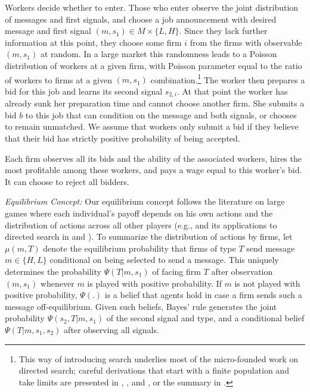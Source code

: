\documentclass[12pt]{article}
\begin{document}
Workers decide whether to enter. Those who enter observe the joint distribution of
messages and first signals, and choose a job announcement with desired
message and first signal $(m,s_{1})\in M\times \{L,H\}$. Since they lack
further information at this point, they choose some firm $i$ from the firms
with observable $(m,s_{1})$ at random. In a large market this randomness
leads to a Poisson distribution of workers at a given firm, with Poisson
parameter equal to the ratio of workers to firms at a given $(m,s_{1})$
combination.\footnote{%
This way of introducing search underlies most of the micro-founded work on
directed search; careful derivations that start with a finite population
and take limits are presented in \cite{peters_1991}, \cite{peters_1997}, and \cite{burdett_etal2001}, or the summary in \cite{wright_etal2021}.} The worker then prepares a bid for
this job and learns its second signal $s_{2,i}$. At that point the worker
has already sunk her preparation time and cannot choose another firm. She
submits a bid $b$ to this job that can condition on the message and both
signals, or chooses to remain unmatched. We assume that workers only submit
a bid if they believe that their bid has strictly positive probability of being
accepted.

Each firm observes all its bids and the ability of the associated workers,
hires the most profitable among these workers, and pays a wage equal to this
worker's bid. It can choose to reject all bidders.

\textit{Equilibrium Concept:} Our equilibrium concept follows the literature on large games where each individual's payoff depends on his own actions and the distribution of actions across all other players (e.g., \cite{mas1984theorem} and its applications to directed search in \cite{eeckhout2010sorting} and \cite{peters2010noncontractible}). To summarize the distribution of actions by firms, let $\mu (m,T)$ denote the equilibrium probability
that firms of type $T$ send message $m\in \{H,L\}$ conditional on being
selected to send a message. This uniquely determines the probability $\Psi
(T|m,s_{1})$ of facing firm $T$ after observation $(m,s_{1})$ whenever $m$
is played with positive probability. If $m$ is not played with positive
probability, $\Psi (.)$ is a belief that agents hold in case a firm sends
such a message off-equilibrium. Given such beliefs, Bayes' rule generates
the joint probability $\Psi (s_{2},T|m,s_{1})$ of the second signal and
type, and a conditional belief $\Psi (T|m,s_{1},s_{2})$ after observing all
signals.
\end{document}
